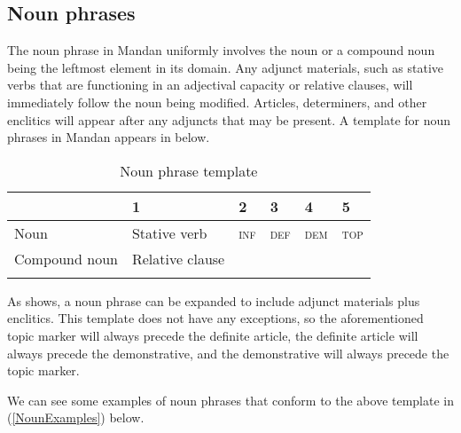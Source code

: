 \subsection{Noun phrases}\label{Ch5NounPhrases}
\largerpage
The noun phrase in Mandan uniformly involves the noun or a compound noun being the leftmost element in its domain. Any adjunct materials, such as stative verbs that are functioning in an adjectival capacity or relative clauses, will immediately follow the noun being modified. Articles, determiners, and other enclitics will appear after any adjuncts that may be present. A template for noun phrases in Mandan appears in  below.

\begin{table}
\caption{Noun phrase template}\label{TabNounPhrase}
\begin{tabular}{llllll}
\lsptoprule
0&1&2&3&4&5\\
\midrule
Noun&Stative verb&\textsc{inf}&\textsc{def}&\textsc{dem}&\textsc{top}\\
Compound noun&Relative clause&\\
\lspbottomrule
\end{tabular}
\end{table}

As  shows, a noun phrase can be expanded to include adjunct materials plus enclitics. This template does not have any exceptions, so the aforementioned topic marker will always precede the definite article, the definite article will always precede the demonstrative, and the demonstrative will always precede the topic marker.

We can see some examples of noun phrases that conform to the above template in (\ref{NounExamples}) below.

